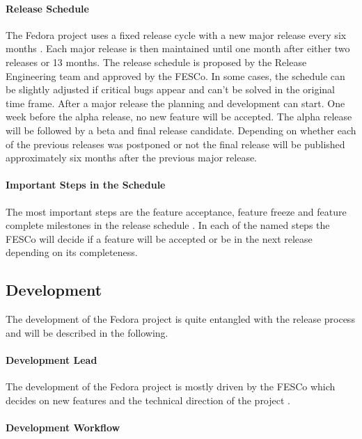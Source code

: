 \paragraph{Release Schedule}

The Fedora project uses a fixed release cycle with a new major release every
six months \cite{FedoraLifeCycle,FedoraReleaseEngineering}. Each major release
is then maintained until one month after either two releases or 13 months. The
release schedule is proposed by the Release Engineering team and approved by
the \ac{FESCo}. In some cases, the schedule can be slightly adjusted if
critical bugs appear and can't be solved in the original time frame. After a
major release the planning and development can start. One week before the alpha
release, no new feature will be accepted. The alpha release will be followed by
a beta and final release candidate. Depending on whether each of the
previous releases was postponed or not the final release will be published
approximately six months after the previous major release.

\paragraph{Important Steps in the Schedule}

The most important steps are the feature acceptance, feature freeze and feature
complete milestones in the release schedule \cite{FedoraLifeCycle}. In each of
the named steps the \ac{FESCo} will decide if a feature will be accepted or be
in the next release depending on its completeness.

\subsection{Development}

The development of the Fedora project is quite entangled with the release
process and will be described in the following.

\paragraph{Development Lead}

The development of the Fedora project is mostly driven by the \ac{FESCo} which
decides on new features and the technical direction of the project
\cite{FedoraFESCo}.

\paragraph{Development Workflow}

